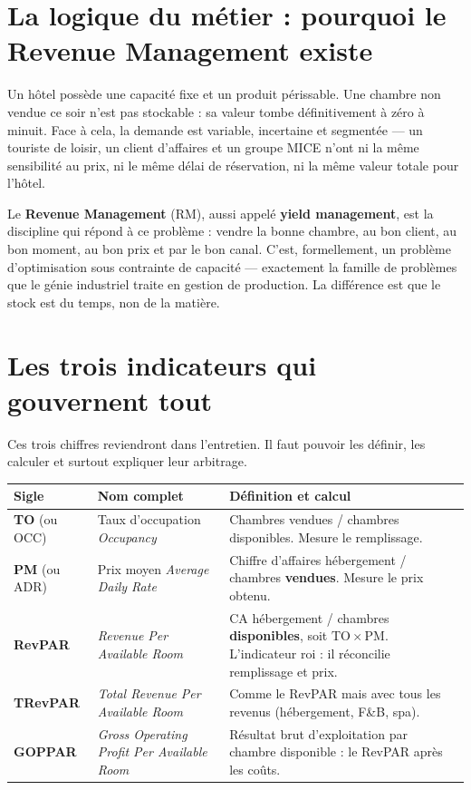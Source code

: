 \documentclass[11pt,a4paper]{article}
\newcommand{\terme}[1]{\textcolor{bleusof}{\textbf{#1}}}
\begin{document}
\section{La logique du métier : pourquoi le Revenue Management existe}

Un hôtel possède une capacité fixe et un produit périssable. Une chambre non vendue ce soir n'est pas stockable : sa valeur tombe définitivement à zéro à minuit. Face à cela, la demande est variable, incertaine et segmentée --- un touriste de loisir, un client d'affaires et un groupe MICE n'ont ni la même sensibilité au prix, ni le même délai de réservation, ni la même valeur totale pour l'hôtel.

Le \terme{Revenue Management} (RM), aussi appelé \terme{yield management}, est la discipline qui répond à ce problème : vendre la bonne chambre, au bon client, au bon moment, au bon prix et par le bon canal. C'est, formellement, un problème d'optimisation sous contrainte de capacité --- exactement la famille de problèmes que le génie industriel traite en gestion de production. La différence est que le stock est du temps, non de la matière.

\section{Les trois indicateurs qui gouvernent tout}

Ces trois chiffres reviendront dans l'entretien. Il faut pouvoir les définir, les calculer et surtout expliquer leur arbitrage.

\begin{center}
\small\renewcommand{\arraystretch}{1.1}
\begin{tabularx}{\textwidth}{@{}L{2.1cm} L{4.3cm} X@{}}
\toprule
{}\textbf{Sigle} & \textbf{Nom complet} & \textbf{Définition et calcul} \\
\midrule
\terme{TO} \newline (ou OCC) & Taux d'occupation \newline \emph{Occupancy} & Chambres vendues / chambres disponibles. Mesure le remplissage. \\
\terme{PM} \newline (ou ADR) & Prix moyen \newline \emph{Average Daily Rate} & Chiffre d'affaires hébergement / chambres \textbf{vendues}. Mesure le prix obtenu. \\
\terme{RevPAR} & \emph{Revenue Per Available Room} & CA hébergement / chambres \textbf{disponibles}, soit $\mathrm{TO} \times \mathrm{PM}$. L'indicateur roi : il réconcilie remplissage et prix. \\
\terme{TRevPAR} & \emph{Total Revenue Per Available Room} & Comme le RevPAR mais avec tous les revenus (hébergement, F\&B, spa). \\
\terme{GOPPAR} & \emph{Gross Operating Profit Per Available Room} & Résultat brut d'exploitation par chambre disponible : le RevPAR après les coûts. \\
\bottomrule
\end{tabularx}
\end{center}
\end{document}
